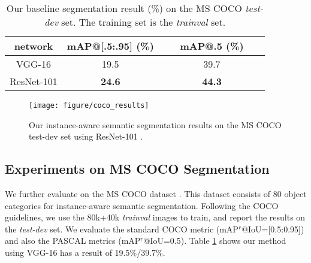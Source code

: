 \documentclass[10pt,twocolumn,letterpaper]{article}
\begin{document}
\setlength{\tabcolsep}{8pt}
\renewcommand{\arraystretch}{1.05}
\begin{table}[t]
\begin{center}
\small
\begin{tabular}{c|c|c}
network & \footnotesize mAP@[.5:.95] (\%)  & \footnotesize ~~~mAP@.5 (\%)~~~\\
\hline
VGG-16 \cite{Simonyan2015} & 19.5 & 39.7 \\
ResNet-101 \cite{He2015a} & \textbf{24.6} & \textbf{44.3} \\
\end{tabular}	
\end{center}
\vspace{-1em}
\caption{Our baseline segmentation result (\%) on the MS COCO \emph{test-dev} set. The training set is the \emph{trainval} set.}
\label{tab:coco_result}
\end{table}

\begin{figure*}[t]
\begin{center}
\texttt{[image: figure/coco\_results]}
\end{center}
\vspace{-1em}
\caption{Our instance-aware semantic segmentation results on the MS COCO test-dev set using ResNet-101 \cite{He2015a}.}
\label{fig:coco_results}
\vspace{-1em}
\end{figure*}

\subsection{Experiments on MS COCO Segmentation}

We further evaluate on the MS COCO dataset \cite{Lin2014}.
This dataset consists of 80 object categories for instance-aware semantic segmentation. Following the COCO guidelines, we use the 80k+40k \emph{trainval} images to train, and report the results on the \emph{test-dev} set. We evaluate the standard COCO metric (mAP$^r$@IoU=[0.5:0.95]) and also the PASCAL metrics (mAP$^r$@IoU=0.5). Table \ref{tab:coco_result} shows our method using VGG-16 has a result of 19.5\%/39.7\%.
\end{document}
